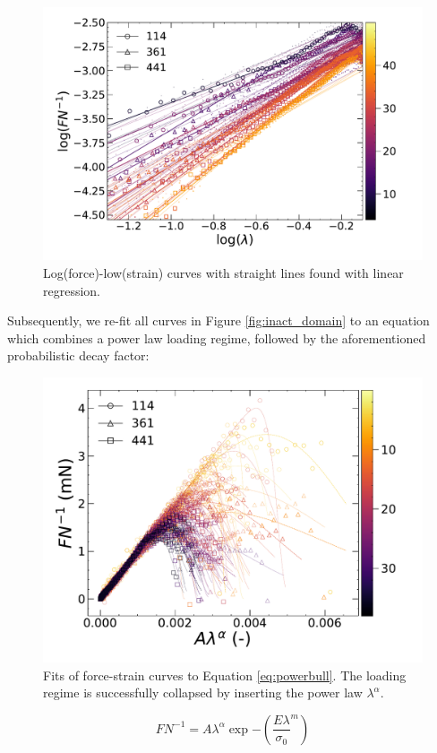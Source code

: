 \documentclass{article}
\begin{document}
\begin{figure}
    \includegraphics[width=0.9\linewidth]{sigma_powerlaw.pdf}
    \caption{Log(force)-low(strain) curves with straight lines found with linear regression.\label{fig:logforce}}
\end{figure}

Subsequently, we re-fit all curves in Figure \ref{fig:inact_domain} to an equation which combines
a power law loading regime, followed by the aforementioned probabilistic decay factor:

\begin{figure}
    \label{fig:powerbull}
    \includegraphics[width=0.9\linewidth]{powerbull_collapse.pdf}
    \caption{Fits of force-strain curves to Equation \ref{eq:powerbull}. The loading regime
    is successfully collapsed by inserting the power law $\lambda^\alpha$.}
\end{figure}


\begin{equation}
    \label{eq:powerbull}
    FN^{-1}=A\lambda^\alpha\exp{-(\frac{E\lambda}{\sigma_0}^m)}
\end{equation}
\end{document}
